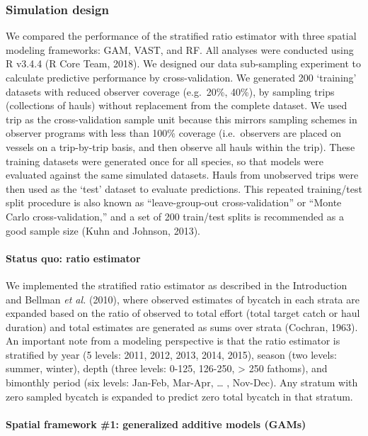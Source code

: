 \documentclass[]{article}
\let\oldparagraph\paragraph
\renewcommand{\paragraph}[1]{\oldparagraph{#1}\mbox{}}
\begin{document}
\subsubsection{Simulation design}\label{simulation-design}

We compared the performance of the stratified ratio estimator with three
spatial modeling frameworks: GAM, VAST, and RF. All analyses were
conducted using R v3.4.4 (R Core Team, 2018). We designed our data
sub-sampling experiment to calculate predictive performance by
cross-validation. We generated 200 `training' datasets with reduced
observer coverage (e.g.~20\%, 40\%), by sampling trips (collections of
hauls) without replacement from the complete dataset. We used trip as
the cross-validation sample unit because this mirrors sampling schemes
in observer programs with less than 100\% coverage (i.e.~observers are
placed on vessels on a trip-by-trip basis, and then observe all hauls
within the trip). These training datasets were generated once for all
species, so that models were evaluated against the same simulated
datasets. Hauls from unobserved trips were then used as the `test'
dataset to evaluate predictions. This repeated training/test split
procedure is also known as ``leave-group-out cross-validation'' or
``Monte Carlo cross-validation,'' and a set of 200 train/test splits is
recommended as a good sample size (Kuhn and Johnson, 2013).

\paragraph{Status quo: ratio
estimator}\label{status-quo-ratio-estimator}

We implemented the stratified ratio estimator as described in the
Introduction and Bellman \emph{et al.} (2010), where observed estimates
of bycatch in each strata are expanded based on the ratio of observed to
total effort (total target catch or haul duration) and total estimates
are generated as sums over strata (Cochran, 1963). An important note
from a modeling perspective is that the ratio estimator is stratified by
year (5 levels: 2011, 2012, 2013, 2014, 2015), season (two levels:
summer, winter), depth (three levels: 0-125, 126-250, \textgreater{} 250
fathoms), and bimonthly period (six levels: Jan-Feb, Mar-Apr, \ldots{} ,
Nov-Dec). Any stratum with zero sampled bycatch is expanded to predict
zero total bycatch in that stratum.

\paragraph{Spatial framework \#1: generalized additive models
(GAMs)}\label{spatial-framework-1-generalized-additive-models-gams}
\end{document}
